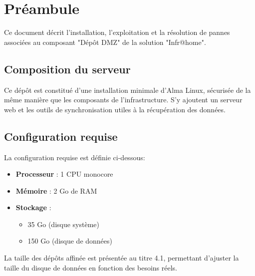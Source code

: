 \section{Préambule}
Ce document décrit l'installation, l'exploitation et la résolution de pannes associées au composant "Dépôt DMZ" de la solution "Infr@home".\\

\subsection{Composition du serveur}
Ce dépôt est constitué d'une installation minimale d'Alma Linux, sécurisée de la même manière que les composants de l'infrastructure. S'y ajoutent un serveur web et les outils de synchronisation utiles à la récupération des données.

\subsection{Configuration requise}

La configuration requise est définie ci-dessous:
\begin{itemize}
    \item \textbf{Processeur} : 1 CPU monocore
    \item \textbf{Mémoire} : 2 Go de RAM
    \item \textbf{Stockage} :
    \begin{itemize}
        \item 35 Go (disque système)
        \item 150 Go (disque de données)
    \end{itemize}
\end{itemize}

\begin{tip}
La taille des dépôts affinée est présentée au titre 4.1, permettant d'ajuster la taille du disque de données en fonction des besoins réels.
\end{tip}

